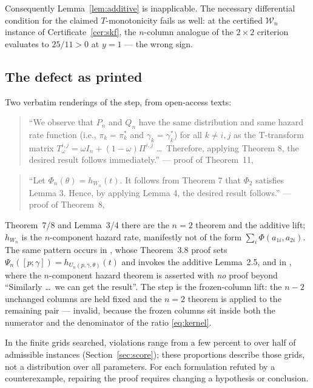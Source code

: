 \documentclass[10pt]{article}
\theoremstyle{plain}
\theoremstyle{definition}
\theoremstyle{remark}
\newcommand{\Wn}{\mathcal W_n}
\begin{document}
Consequently Lemma~\ref{lem:additive} is inapplicable. The necessary differential condition for the claimed $T$-monotonicity fails as well: at the certified $\Wn$ instance of Certificate~\ref{cer:skf}, the $n$-column analogue of the $2\times2$ criterion evaluates to $25/11>0$ at $y=1$ --- the wrong sign.

\subsection{The defect as printed}\label{sec:defect}

Two verbatim renderings of the step, from open-access texts:

\begin{quote}
``We observe that $P_n$ and $Q_n$ have the same distribution and same hazard rate function (i.e., $\pi_k=\pi_k^*$ and $\gamma_k=\gamma_k^*$) for all $k\neq i,j$ as the T-transform matrix $T^{i,j}_\omega=\omega I_n+(1-\omega)\Pi^{i,j}$ \dots\ Therefore, applying Theorem 8, the desired result follows immediately.'' --- proof of Theorem~11, \cite{ShekariEtAl2026}
\end{quote}

\begin{quote}
``Let $\Phi_n(\theta)=h_{W_n}(t)$. It follows from Theorem 7 that $\Phi_2$ satisfies Lemma 3. Hence, by applying Lemma 4, the desired result follows.'' --- proof of Theorem~8, \cite{SahooKayalBalakrishnan2026}
\end{quote}

Theorem~7/8 and Lemma~3/4 there are the $n=2$ theorem and the additive lift; $h_{W_n}$ is the $n$-component hazard rate, manifestly not of the form $\sum_i\Phi(a_{1i},a_{2i})$. The same pattern occurs in \cite{SahooKayalFinkelstein2026}, whose Theorem~3.8 proof sets $\Psi_n([p;\gamma])=h_{U_n(p,\gamma,\theta)}(t)$ and invokes the additive Lemma~2.5, and in \cite{GuoYan2024}, where the $n$-component hazard theorem is asserted with \emph{no} proof beyond ``Similarly \dots\ we can get the result''. The step is the frozen-column lift: the $n-2$ unchanged columns are held fixed and the $n=2$ theorem is applied to the remaining pair --- invalid, because the frozen columns sit inside both the numerator and the denominator of the ratio \eqref{eq:kernel}.

In the finite grids searched, violations range from a few percent to over half of admissible instances (Section~\ref{sec:score}); these proportions describe those grids, not a distribution over all parameters. For each formulation refuted by a counterexample, repairing the proof requires changing a hypothesis or conclusion.
\end{document}
